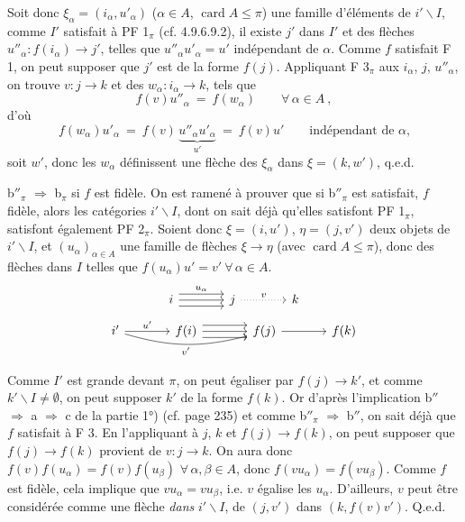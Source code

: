 \documentclass[11pt]{article}
\newcommand{\printedpage}[1]{\marginpar{\footnotesize p.~#1}}
\newcommand{\msp}[1]{\marginpar{\footnotesize [#1]}}
\newcommand{\card}{\operatorname{card}}
\begin{document}
\msp{page 241}
Soit donc $\xi_\alpha = (i_\alpha, u'_\alpha)$ ($\alpha \in A$, $\card A \leqslant \pi$) une famille d'éléments de $i'\backslash I$, comme $I'$ satisfait à PF 1$_\pi$ (cf. 4.9.6.9.2), il existe $j'$ dans $I'$ et des flèches $u''_\alpha : f(i_\alpha) \longrightarrow j'$, telles que $u''_\alpha u'_\alpha = u'$ indépendant de $\alpha$. Comme $f$ satisfait F 1, on peut supposer que $j'$ est de la forme $f(j)$. Appliquant F 3$_\pi$ aux $i_\alpha$, $j$, $u''_\alpha$, on trouve $v : j \longrightarrow k$ et des $w_\alpha : i_\alpha \longrightarrow k$, tels que
\[
f(v)u''_\alpha \ = \ f(w_\alpha) \qquad \forall\, \alpha \in A \ ,
\]
d'où
\[
f(w_\alpha)u'_\alpha \ = \ f(v)\,\underbrace{u''_\alpha u'_\alpha}_{u'} \ = \ f(v)u' \qquad \text{indépendant de $\alpha$,}
\]
soit $w'$, donc les $w_\alpha$ définissent une flèche des $\xi_\alpha$ dans $\xi = (k, w')$, q.e.d.

b$''_\pi$ $\Longrightarrow$ b$_\pi$ si $f$ est fidèle. On est ramené à prouver que si b$''_\pi$ est satisfait, $f$ fidèle, alors les catégories $i'\backslash I$, dont on sait déjà qu'elles satisfont PF 1$_\pi$, satisfont également PF 2$_\pi$. Soient donc $\xi = (i, u')$, $\eta = (j, v')$ deux objets de $i'\backslash I$, et $(u_\alpha)_{\alpha\in A}$ une famille de flèches $\xi \longrightarrow \eta$ (avec $\card A \leqslant \pi$), donc des flèches dans $I$ telles que $f(u_\alpha)u' = v' \ \forall\, \alpha \in A$.
\[
\begin{tikzcd}[column sep=large]
i \arrow[r, shift left=2, "u_\alpha"] \arrow[r] \arrow[r, shift right=2] & j \arrow[r, dotted, "v"] & k
\end{tikzcd}
\]
\[
\begin{tikzcd}[column sep=large]
i' \arrow[r, "u'"] \arrow[rr, bend right=15, "v'"'] & f(i) \arrow[r, shift left=2] \arrow[r] \arrow[r, shift right=2] & f(j) \arrow[r] & f(k)
\end{tikzcd}
\]

Comme $I'$ est grande devant $\pi$, on peut égaliser par $f(j) \longrightarrow k'$, et comme $k'\backslash I \neq \emptyset$, on peut supposer $k'$ de la forme $f(k)$. Or
\msp{page 242}
d'après l'implication b$''$ $\Longrightarrow$ a $\Longrightarrow$ c de la partie 1°) (cf. page 235) et comme b$''_\pi$ $\Longrightarrow$ b$''$, on sait déjà que $f$ satisfait à F 3. En l'appliquant à $j$, $k$ et $f(j) \longrightarrow f(k)$, on peut
\printedpage{91}
supposer que $f(j) \longrightarrow f(k)$ provient de $v : j \longrightarrow k$. On aura donc $f(v)f(u_\alpha) = f(v)f(u_\beta)$ $\forall\, \alpha, \beta \in A$, donc $f(vu_\alpha) = f(vu_\beta)$. Comme $f$ est fidèle, cela implique que $vu_\alpha = vu_\beta$, i.e. $v$ égalise les $u_\alpha$. D'ailleurs, $v$ peut être considérée comme une flèche \textit{dans} $i'\backslash I$, de $(j, v')$ dans $(k, f(v)v')$. Q.e.d.
\end{document}
